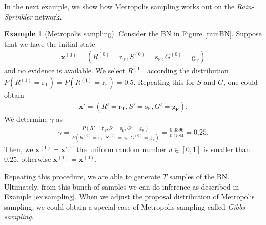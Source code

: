 \documentclass[a4paper, twoside, 11pt]{report}
\newcommand{\bfx}{{\mathbf{x}}}
\theoremstyle{plain}
\theoremstyle{definition}
\newtheorem{example}[thm]{Example}
\theoremstyle{remark}
\newcommand{\gT}{{\text{g}_\text{T} }}
\newcommand{\gF}{{\text{g}_\text{F} }}
\newcommand{\sF}{{\text{s}_\text{F} }}
\newcommand{\rT}{{\text{r}_\text{T} }}
\newcommand{\rF}{{\text{r}_\text{F} }}
\begin{document}
In the next example, we show how Metropolis sampling works out on the \textit{Rain-Sprinkler} network.
\begin{example}[Metropolis sampling]
Consider the BN in Figure \ref{rainBN}. Suppose that we have the initial state 
\begin{align*}
\bfx^{(0)} = (R^{(0)} = \rT, S^{(0)} = \sF, G^{(0)} = \gT)
\end{align*}
and no evidence is available. We select $R^{(1)}$ according the distribution $P(R^{(1)}=\rT)=P(R^{(1)}=\rF) = 0.5$. Repeating this for $S$ and $G$, one could obtain
\begin{align*}
\bfx' = (R' = \rT, S' = \sF, G' = \gF).
\end{align*}
We determine $\gamma$ as
\begin{align*}
\gamma = \frac{P(R' = \rT, S' = \sF, G' = \gF)}{P(R^{(0)} = \rT, S^{(0)} = \sF, G^{(0)} = \gT)} = \frac{0.0396}{0.1584} = 0.25. 
\end{align*}
Then, we $\bfx^{(1)} = \bfx'$ if the uniform random number $u \in [0,1]$ is smaller than $0.25$, otherwise $\bfx^{(1)} = \bfx^{(0)}$.
\end{example}
Repeating this procedure, we are able to generate $T$ samples of the BN. Ultimately, from this bunch of samples we can do inference as described in Example \ref{ex:sampling}. When we adjust the proposal distribution of Metropolis sampling, we could obtain a special case of Metropolis sampling called \textit{Gibbs sampling}. 
\end{document}
